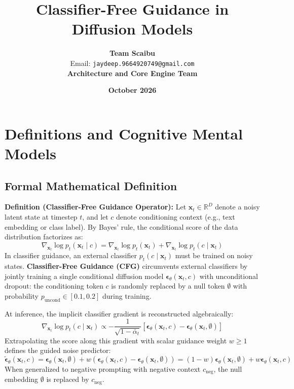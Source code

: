 \documentclass[11pt,a4paper]{article}
\title{\textbf{Classifier-Free Guidance in Diffusion Models}}
\author{\textbf{Team Scaibu} \\ \small Email: \texttt{jaydeep.9664920749@gmail.com} \\ \small \textbf{Architecture and Core Engine Team}}
\date{\textbf{October 2026}}
\theoremstyle{definition}
\begin{document}
\maketitle

\section{Definitions and Cognitive Mental Models}

\subsection{Formal Mathematical Definition}
\textbf{Definition (Classifier-Free Guidance Operator):}
Let $\mathbf{x}_t \in \mathbb{R}^D$ denote a noisy latent state at timestep $t$, and let $c$ denote conditioning context (e.g., text embedding or class label). By Bayes' rule, the conditional score of the data distribution factorizes as:
{\boldmath
\begin{equation}
\nabla_{\mathbf{x}_t} \log p_t(\mathbf{x}_t \mid c) = \nabla_{\mathbf{x}_t} \log p_t(\mathbf{x}_t) + \nabla_{\mathbf{x}_t} \log p_t(c \mid \mathbf{x}_t)
\end{equation}
}
In classifier guidance, an external classifier $p_t(c \mid \mathbf{x}_t)$ must be trained on noisy states. \textbf{Classifier-Free Guidance (CFG)} circumvents external classifiers by jointly training a single conditional diffusion model $\boldsymbol{\epsilon}_\theta(\mathbf{x}_t, c)$ with unconditional dropout: the conditioning token $c$ is randomly replaced by a null token $\emptyset$ with probability $p_{\text{uncond}} \in [0.1, 0.2]$ during training.

At inference, the implicit classifier gradient is reconstructed algebraically:
{\boldmath
\begin{equation}
\nabla_{\mathbf{x}_t} \log p_t(c \mid \mathbf{x}_t) \propto -\frac{1}{\sqrt{1 - \bar{\alpha}_t}} \left[ \boldsymbol{\epsilon}_\theta(\mathbf{x}_t, c) - \boldsymbol{\epsilon}_\theta(\mathbf{x}_t, \emptyset) \right]
\end{equation}
}
Extrapolating the score along this gradient with scalar guidance weight $w \ge 1$ defines the guided noise predictor:
{\boldmath
\begin{equation}
\tilde{\boldsymbol{\epsilon}}_\theta(\mathbf{x}_t, c) = \boldsymbol{\epsilon}_\theta(\mathbf{x}_t, \emptyset) + w \left( \boldsymbol{\epsilon}_\theta(\mathbf{x}_t, c) - \boldsymbol{\epsilon}_\theta(\mathbf{x}_t, \emptyset) \right) = (1 - w)\boldsymbol{\epsilon}_\theta(\mathbf{x}_t, \emptyset) + w \boldsymbol{\epsilon}_\theta(\mathbf{x}_t, c)
\end{equation}
}
When generalized to negative prompting with negative context $c_{\text{neg}}$, the null embedding $\emptyset$ is replaced by $c_{\text{neg}}$.
\end{document}
